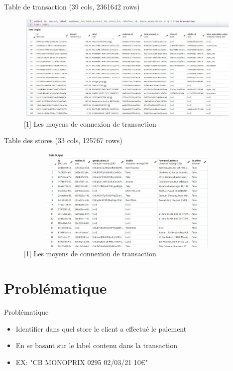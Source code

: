 \documentclass{beamer}
\begin{document}
\begin{frame}{Table de transaction (39 cols, 2361642 rows)}
\begin{figure}[H]
    \includegraphics[width=11cm,height=5.2cm]{images/transaction.jpeg}
    \caption{[1] Les moyens de connexion de transaction}
    \label{fig:L1}
\end{figure}
\end{frame} 

\begin{frame}{Table des stores (33 cols, 125767 rows) }
\begin{figure}[H]
    \includegraphics[width=11cm,height=5cm]{images/stores.jpeg}
    \caption{[1] Les moyens de connexion de transaction}
    \label{fig:L1}
\end{figure}
\end{frame} 

\section{Problématique}
\begin{frame}{Problématique}
\begin{itemize}
		\item Identifier dans quel store le client a effectué le paiement 
		\item En se basant sur le label contenu dans la transaction
		\item EX: "CB MONOPRIX 0295 02/03/21 10€" 
\end{itemize}
\end{frame} 
\end{document}
